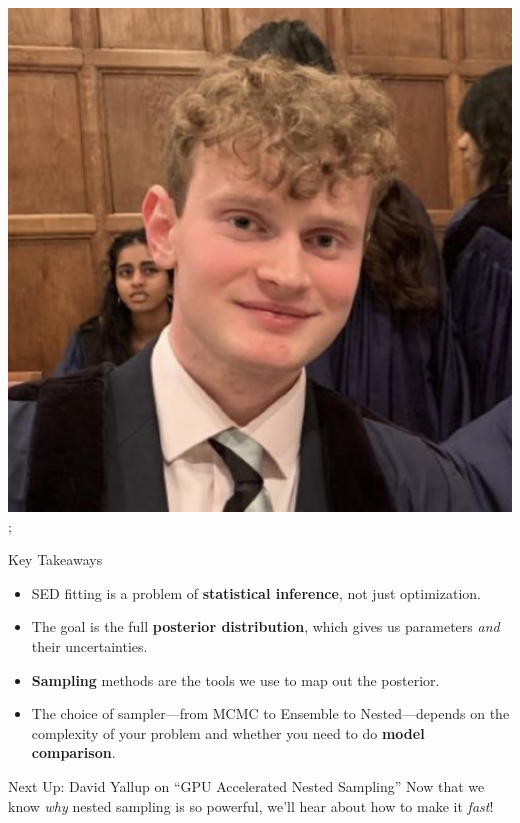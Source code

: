 \documentclass[aspectratio=169]{beamer}
\newcommand{\keyterm}[1]{\textbf{\textcolor{C0}{#1}}}
\begin{document}
\begin{frame}
{        \includegraphics[width=0.06\textheight]{people/will_templeton.jpg}%
    };
    \begin{block}{Key Takeaways}
        \begin{itemize}
            \item SED fitting is a problem of \keyterm{statistical inference}, not just optimization.
            \item The goal is the full \keyterm{posterior distribution}, which gives us parameters \textit{and} their uncertainties.
            \item \keyterm{Sampling} methods are the tools we use to map out the posterior.
            \item The choice of sampler—from MCMC to Ensemble to Nested—depends on the complexity of your problem and whether you need to do \keyterm{model comparison}.
        \end{itemize}
    \end{block}
    \begin{alertblock}{Next Up: David Yallup on ``GPU Accelerated Nested Sampling''}
        Now that we know \textit{why} nested sampling is so powerful, we'll hear about how to make it \textit{fast}!
    \end{alertblock}
\end{frame}
\end{document}
